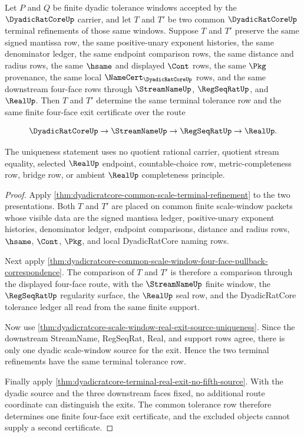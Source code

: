 \begin{theorem}
\label{thm:dyadicratcore-common-scale-terminal-refinement-uniqueness}
Let $P$ and $Q$ be finite dyadic tolerance windows accepted by the $\DyadicRatCoreUp$ carrier, and let $T$ and $T'$ be two common $\DyadicRatCoreUp$ terminal refinements of those same windows. Suppose $T$ and $T'$ preserve the same signed mantissa row, the same positive-unary exponent histories, the same denominator ledger, the same endpoint comparison rows, the same distance and radius rows, the same $\hsame$ and displayed $\Cont$ rows, the same $\Pkg$ provenance, the same local $\NameCert_{\DyadicRatCoreUp}$ rows, and the same downstream four-face rows through $\StreamNameUp$, $\RegSeqRatUp$, and $\RealUp$. Then $T$ and $T'$ determine the same terminal tolerance row and the same finite four-face exit certificate over the route

$$
\DyadicRatCoreUp \to \StreamNameUp \to \RegSeqRatUp \to \RealUp .
$$

The uniqueness statement uses no quotient rational carrier, quotient stream equality, selected $\RealUp$ endpoint, countable-choice row, metric-completeness row, bridge row, or ambient $\RealUp$ completeness principle.
\end{theorem}
\begin{proof}
Apply \autoref{thm:dyadicratcore-common-scale-terminal-refinement} to the two presentations. Both $T$ and $T'$ are placed on common finite scale-window packets whose visible data are the signed mantissa ledger, positive-unary exponent histories, denominator ledger, endpoint comparisons, distance and radius rows, $\hsame$, $\Cont$, $\Pkg$, and local DyadicRatCore naming rows.

Next apply \autoref{thm:dyadicratcore-common-scale-window-four-face-pullback-correspondence}. The comparison of $T$ and $T'$ is therefore a comparison through the displayed four-face route, with the $\StreamNameUp$ finite window, the $\RegSeqRatUp$ regularity surface, the $\RealUp$ seal row, and the DyadicRatCore tolerance ledger all read from the same finite support.

Now use \autoref{thm:dyadicratcore-scale-window-real-exit-source-uniqueness}. Since the downstream StreamName, RegSeqRat, Real, and support rows agree, there is only one dyadic scale-window source for the exit. Hence the two terminal refinements have the same terminal tolerance row.

Finally apply \autoref{thm:dyadicratcore-terminal-real-exit-no-fifth-source}. With the dyadic source and the three downstream faces fixed, no additional route coordinate can distinguish the exits. The common tolerance row therefore determines one finite four-face exit certificate, and the excluded objects cannot supply a second certificate.
\end{proof}

